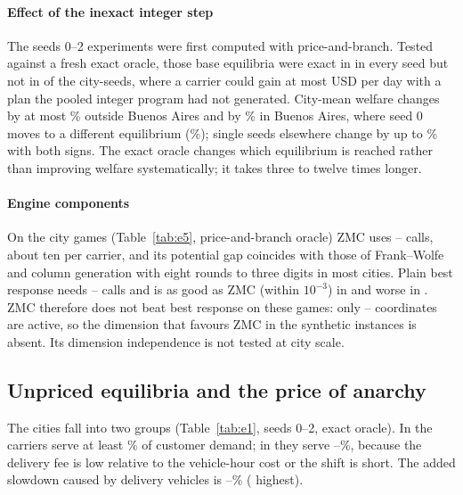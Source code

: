 \documentclass[preprint,11pt]{elsarticle}
\theoremstyle{definition}
\theoremstyle{remark}
\begin{document}
\paragraph{Effect of the inexact integer step} The seeds 0--2 experiments were first computed with price-and-branch. Tested against a fresh exact oracle, those base equilibria were exact in \ExOldExactCities{} in every seed but not in \ExOldBadN{} of the \ExOldN{} city-seeds, where a carrier could gain at most \ExOldBadMax{} USD per day with a plan the pooled integer program had not generated. City-mean welfare changes by at most \ExEoneWMeanMaxNotBA\% outside Buenos Aires and by \ExEoneWMeanBA\% in Buenos Aires, where seed 0 moves to a different equilibrium (\ExEoneWChangeBA\%); single seeds elsewhere change by up to \ExEoneWChangeMaxNotBA\% with both signs. The exact oracle changes which equilibrium is reached rather than improving welfare systematically; it takes three to twelve times longer.

\paragraph{Engine components} On the city games (Table~\ref{tab:e5}, price-and-branch oracle) ZMC uses \EfiveCallsZMCmin--\EfiveCallsZMCmax{} calls, about ten per carrier, and its potential gap coincides with those of Frank--Wolfe and column generation with eight rounds to three digits in most cities. Plain best response needs \EfiveCallsBRmin--\EfiveCallsBRmax{} calls and is as good as ZMC (within $10^{-3}$) in \EfiveBRasgoodCities{} and worse in \EfiveBRworseCities. ZMC therefore does not beat best response on these games: only \EfiveDeffMin--\EfiveDeffMax{} coordinates are active, so the dimension that favours ZMC in the synthetic instances is absent. Its dimension independence is not tested at city scale.

\subsection{Unpriced equilibria and the price of anarchy}\label{sec:res-eq}\label{sec:res-poa}

The cities fall into two groups (Table~\ref{tab:e1}, seeds 0--2, exact oracle). In \EoneHighCities{} the carriers serve at least \EoneServedHighMin\% of customer demand; in \EoneLowCities{} they serve \EoneServedLowMin--\EoneServedLowMax\%, because the delivery fee is low relative to the vehicle-hour cost or the shift is short. The added slowdown caused by delivery vehicles is \EoneSlowMin--\EoneSlowMax\% (\EoneSlowMaxCity{} highest).
\end{document}
